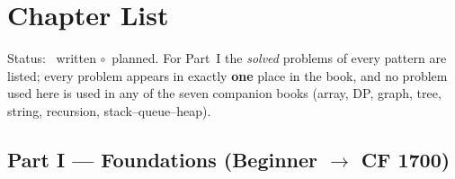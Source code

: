 \section*{Chapter List}

Status: \yes~written \quad $\circ$~planned. For Part~I the \emph{solved} problems of every pattern are listed; every problem appears in exactly \textbf{one} place in the book, and no problem used here is used in any of the seven companion books (array, DP, graph, tree, string, recursion, stack--queue--heap).

\begingroup
\small
\renewcommand{\arraystretch}{1.25}

\subsection*{Part I --- Foundations (Beginner $\to$ CF 1700)}
